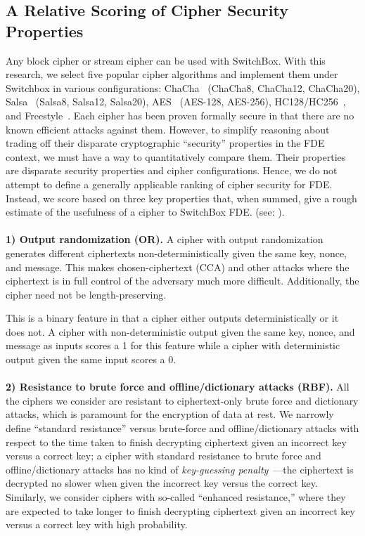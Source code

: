 \subsection{A Relative Scoring of Cipher Security Properties}

Any block cipher or stream cipher can be used with SwitchBox. With this
research, we select five popular cipher algorithms and implement them under
Switchbox in various configurations: ChaCha~\cite{ChaCha20} (ChaCha8, ChaCha12,
ChaCha20), Salsa~\cite{SalsaX} (Salsa8, Salsa12, Salsa20), AES~\cite{AES}
(AES-128, AES-256), HC128/HC256~\cite{HCX}, and Freestyle~\cite{Freestyle}. Each
cipher has been proven formally secure in that there are no known efficient
attacks against them. However, to simplify reasoning about trading off their
disparate cryptographic ``security'' properties in the FDE context, we must have
a way to quantitatively compare them. Their properties are disparate security
properties and cipher configurations. Hence, we do not attempt to define a
generally applicable ranking of cipher security for FDE. Instead, we score based
on three key properties that, when summed, give a rough estimate of the
usefulness of a cipher to SwitchBox FDE. (see: ).\\
\\
\textbf{1) Output randomization (OR).} A cipher with output randomization
generates different ciphertexts non-deterministically given the same key, nonce,
and message. This makes chosen-ciphertext (CCA) and other attacks where the
ciphertext is in full control of the adversary much more difficult.
Additionally, the cipher need not be length-preserving.

This is a binary feature in that a cipher either outputs deterministically or
it does not. A cipher with non-deterministic output given the same key, nonce,
and message as inputs scores a 1 for this feature while a cipher with
deterministic output given the same input scores a 0.\\
\\
\textbf{2) Resistance to brute force and offline/dictionary attacks (RBF).}
All the ciphers we consider are resistant to ciphertext-only brute force and
dictionary attacks, which is paramount for the encryption of data at rest. We
narrowly define ``standard resistance'' versus brute-force and
offline/dictionary attacks with respect to the time taken to finish decrypting
ciphertext given an incorrect key versus a correct key; a cipher with standard
resistance to brute force and offline/dictionary attacks has no kind of
\emph{key-guessing penalty}~\cite{Freestyle}---the ciphertext is decrypted no
slower when given the incorrect key versus the correct key. Similarly, we
consider ciphers with so-called ``enhanced resistance,'' where they are expected
to take longer to finish decrypting ciphertext given an incorrect key versus a
correct key with high probability.

